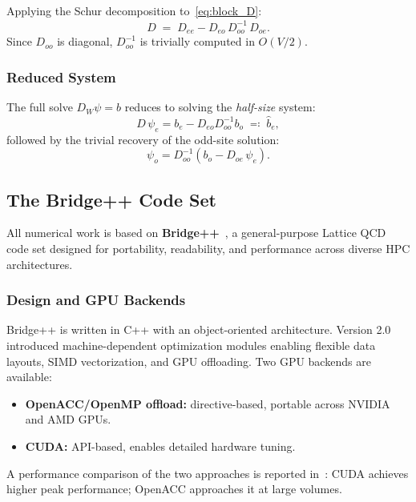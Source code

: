 \documentclass[12pt,a4paper]{article}
\begin{document}
Applying the Schur decomposition to~\eqref{eq:block_D}:
\begin{equation}
  \hat{D} \;=\; D_{ee} - D_{eo}\,D_{oo}^{-1}\,D_{oe}.
  \label{eq:schur}
\end{equation}
Since $D_{oo}$ is diagonal, $D_{oo}^{-1}$ is trivially computed in $O(V/2)$.

\subsubsection{Reduced System}

The full solve $D_W \psi = b$ reduces to solving the \emph{half-size} system:
\begin{equation}
  \hat{D}\,\psi_e = b_e - D_{eo}D_{oo}^{-1}b_o \;\eqqcolon\; \hat{b}_e,
  \label{eq:reduced}
\end{equation}
followed by the trivial recovery of the odd-site solution:
\begin{equation}
  \psi_o = D_{oo}^{-1}(b_o - D_{oe}\,\psi_e).
\end{equation}

\subsection{The Bridge++ Code Set}
\label{sec:bridgepp}

All numerical work is based on \textbf{Bridge++}~\cite{Bridge,Akahoshi2022},
a general-purpose Lattice QCD code set designed for portability, readability,
and performance across diverse HPC architectures.

\subsubsection{Design and GPU Backends}

Bridge++ is written in C++ with an object-oriented architecture.
Version 2.0~\cite{Akahoshi2022} introduced machine-dependent optimization
modules enabling flexible data layouts, SIMD vectorization, and GPU offloading.
Two GPU backends are available:
\begin{itemize}
  \item \textbf{OpenACC/OpenMP offload:} directive-based, portable across
        NVIDIA and AMD GPUs.
  \item \textbf{CUDA:} API-based, enables detailed hardware tuning.
\end{itemize}
A performance comparison of the two approaches is reported in~\cite{Chen2025}:
CUDA achieves higher peak performance; OpenACC approaches it at large volumes.
\end{document}
